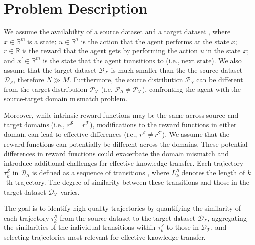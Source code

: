 \section{Problem Description} 
\label{sec:problem_desc}
We assume the availability of a source dataset   and a target dataset , where $x \in \mathbb{R}^{m}$ is a state; $u \in \mathbb{R}^{n}$ is the action that the agent performs at the state $x$; $r \in \mathbb{R}$ is the reward that the agent gets by performing the action $u$ in the state $x$; and $x^{\prime} \in \mathbb{R}^{m}$ is the state that the agent transitions to (i.e., next state). We also assume that the target dataset $\mathcal{D_T}$ is much smaller than the the source dataset $\mathcal{D_S}$, therefore $N \gg M$. Furthermore, the source distribution $\mathcal{P}_{\mathcal{S}}$ can be different from the target distribution $\mathcal{P}_{\mathcal{T}}$ (i.e. $\mathcal{P}_{\mathcal{S}} \neq \mathcal{P}_{\mathcal{T}}$), confronting the agent with the source-target domain mismatch problem. 


Moreover, while intrinsic reward functions may be the same across source and target domains (i.e., $r^{\mathcal{S}} = r^{\mathcal{T}}$), modifications to the reward functions in either domain can lead to effective differences (i.e., $r^{\mathcal{S}} \neq r^{\mathcal{T}}$). We assume that the reward functions can potentially be different across the domains. These potential differences in reward functions could exacerbate the domain mismatch and introduce additional challenges for effective knowledge transfer. Each trajectory $\tau_k^{\mathcal{S}}$ in $\mathcal{D_S}$ is defined as a sequence of transitions , where $L_k^{\mathcal{S}}$ denotes the length of $k$-th trajectory. The degree of similarity between these transitions and those in the target dataset $\mathcal{D_T}$ varies.

The goal is to identify high-quality trajectories by quantifying the similarity of each trajectory $\tau_k^{\mathcal{S}}$ from the source dataset to the target dataset $\mathcal{D_T}$, aggregating the similarities of the individual transitions within $\tau_k^{\mathcal{S}}$ to those in $\mathcal{D_T}$, and selecting trajectories most relevant for effective knowledge transfer.



